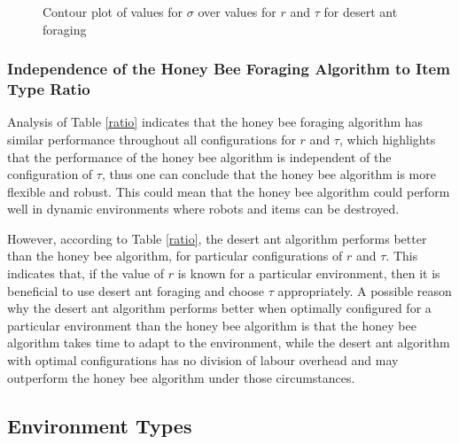 \begin{figure}[!htb]
\centering
\resizebox{0.8\textwidth}{!}{}
\caption{Contour plot of values for $\sigma$ over values for $r$ and $\tau$ for desert ant foraging}
\label{desertantplot}
\end{figure}


%


\subsubsection{Independence of the Honey Bee Foraging Algorithm to Item Type Ratio}
\label{Adaptability}

Analysis of Table \ref{ratio} indicates that the honey bee foraging algorithm has similar performance throughout all configurations for $r$ and $\tau$, which highlights that the performance of the honey bee algorithm is independent of the configuration of $\tau$, thus one can conclude that the honey bee algorithm is more flexible and robust. This could mean that the honey bee algorithm could perform well in dynamic environments where robots and items can be destroyed.

However, according to Table \ref{ratio}, the desert ant algorithm performs better than the honey bee algorithm, for particular configurations of $r$ and $\tau$. This indicates that, if the value of $r$ is known for a particular environment, then it is beneficial to use desert ant foraging and choose $\tau$ appropriately. A possible reason why the desert ant algorithm performs better when optimally configured for a particular environment than the honey bee algorithm is that the honey bee algorithm takes time to adapt to the environment, while the desert ant algorithm with optimal configurations has no division of labour overhead and may outperform the honey bee algorithm under those circumstances.

\subsection{Environment Types}
\label{results:environmentaltypes}

